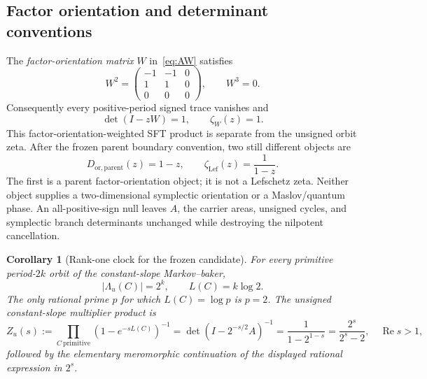 \documentclass[11pt]{article}
\newtheorem{corollary}[theorem]{Corollary}
\theoremstyle{definition}
\theoremstyle{remark}
\begin{document}
\subsection{Factor orientation and determinant conventions}

The \emph{factor-orientation matrix} \(W\) in~\eqref{eq:AW} satisfies
\begin{equation}
 W^2=\begin{pmatrix}-1&-1&0\\1&1&0\\0&0&0\end{pmatrix},
 \qquad W^3=0.
 \label{eq:W-nilpotent}
\end{equation}
Consequently every positive-period signed trace vanishes and
\begin{equation}
 \det(I-zW)=1,
 \qquad \zeta_{W}(z)=1.
 \label{eq:W-zeta}
\end{equation}
This factor-orientation-weighted SFT product is separate from the unsigned
orbit zeta.  After the frozen parent boundary convention, two still different
objects are
\begin{equation}
 D_{\mathrm{or,parent}}(z)=1-z,
 \qquad
 \zeta_{\mathrm{Lef}}(z)=\frac1{1-z}.
 \label{eq:orientation-conventions}
\end{equation}
The first is a parent factor-orientation object; it is not a Lefschetz zeta.
Neither object supplies a two-dimensional symplectic orientation or a
Maslov/quantum phase.  An all-positive-sign null leaves \(A\), the carrier
areas, unsigned cycles, and symplectic branch determinants unchanged while
destroying the nilpotent cancellation.

\begin{corollary}[Rank-one clock for the frozen candidate]
\label{cor:candidate}
For every primitive period-\(2k\) orbit of the constant-slope Markov--baker,
\begin{equation}
 |\Lambda_u(C)|=2^k,
 \qquad L(C)=k\log2.
 \label{eq:candidate-length}
\end{equation}
The only rational prime \(p\) for which \(L(C)=\log p\) is \(p=2\).  The
unsigned constant-slope multiplier product is
\begin{equation}
 Z_u(s):=\prod_{C\ \mathrm{primitive}}
       \left(1-e^{-sL(C)}\right)^{-1}
 =\det\!\left(I-2^{-s/2}A\right)^{-1}
 =\frac1{1-2^{1-s}}
 =\frac{2^s}{2^s-2},
 \quad \operatorname{Re}s>1,
 \label{eq:multiplier-product}
\end{equation}
followed by the elementary meromorphic continuation of the displayed
rational expression in \(2^s\).
\end{corollary}
\end{document}
